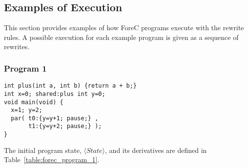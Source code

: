 \subsection{Examples of Execution}
This section provides examples of how ForeC programs
execute with the rewrite rules. A possible execution 
for each example program is given as a sequence of 
rewrites. 

\subsubsection{Program 1}
\begin{lstlisting}[style=snippet]
int plus(int a, int b) {return a + b;}
int x=0; shared:plus int y=0;
void main(void) {
  x=1; y=2;
  par( t0:{y=y+1; pause;} , 
       t1:{y=y+2; pause;} );
}
\end{lstlisting}
The initial program state, $\langle State \rangle$,
and its derivatives are defined in Table~\ref{table:forec_program_1}.
\newline

